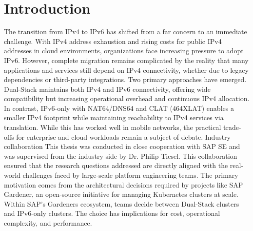 \chapter{Introduction}
The transition from IPv4 to IPv6 has shifted from a far concern to an immediate challenge. With IPv4 address exhaustion and rising costs for public IPv4 addresses in cloud environments, organizations face increasing pressure to adopt IPv6. However, complete migration remains complicated by the reality that many applications and services still depend on IPv4 connectivity, whether due to legacy dependencies or third-party integrations.
Two primary approaches have emerged. Dual-Stack maintains both IPv4 and IPv6 connectivity, offering wide compatibility but increasing operational overhead and continuous IPv4 allocation. In contrast, IPv6-only with NAT64/DNS64 and CLAT (464XLAT) enables a smaller IPv4 footprint while maintaining reachability to IPv4 services via translation. While this has worked well in mobile networks, the practical trade-offs for enterprise and cloud workloads remain a subject of debate.
Industry collaboration 
This thesis was conducted in close cooperation with SAP SE and was supervised from the industry side by Dr. Philip Tiesel. This collaboration ensured that the research questions addressed are directly aligned with the real-world challenges faced by large-scale platform engineering teams. The primary motivation comes from the architectural decisions required by projects like SAP Gardener, an open-source initiative for managing Kubernetes clusters at scale. Within SAP’s Gardeners ecosystem, teams decide between Dual-Stack clusters and IPv6-only clusters. The choice has implications for cost, operational complexity, and performance. 

